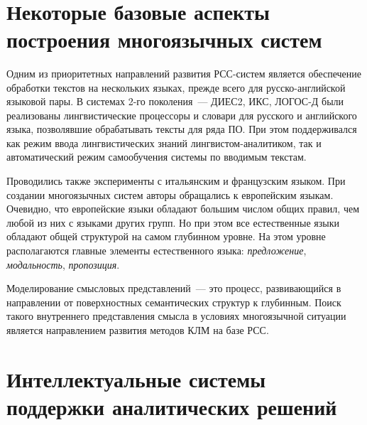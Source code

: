 \begin{multicols}{2}
\begin{figure*}[b] %
\vspace*{24pt}
\begin{center}
\mbox{%
\epsfxsize=156.873mm
}
\end{center}
\end{figure*}
     

\section{Некоторые базовые аспекты построения многоязычных 
систем}
     
     Одним из приоритетных направлений развития РСС-сис\-тем является 
обеспечение обработки текстов на нескольких языках, прежде всего для 
рус\-ско-анг\-лий\-ской языковой пары. В системах 2-го поколения~--- ДИЕС2, 
ИКС, ЛОГОС-Д были реализованы лингвистические процессоры и словари 
для русского и английского языка, позволявшие обрабатывать тексты для 
ряда ПО. При этом поддерживался как режим ввода 
лингвистических знаний линг\-вис\-том-ана\-ли\-ти\-ком, так и 
автоматический режим самообучения системы по вводимым \mbox{текстам}. 
{

}

Проводились также эксперименты с итальянским и французским языком. 
При создании многоязычных систем авторы обращались к европейским 
языкам. Очевидно, что европейские языки обладают большим числом общих 
правил, чем любой из них с языками других групп. Но при этом все 
естественные языки обладают общей структурой на самом глубинном 
уровне. На этом уровне располагаются главные элементы естественного 
языка: \textit{предложение}, \textit{модальность}, \textit{пропозиция}.
     
     Моделирование смысловых представлений~--- это процесс, 
развивающийся в направлении от поверхностных семантических структур к 
глубинным. Поиск такого внутреннего представления смысла в условиях 
многоязычной ситуации является на\-прав\-ле\-ни\-ем развития методов 
     КЛМ на базе  РСС. 
     
     
\section{Интеллектуальные системы поддержки аналитических 
решений}
     

\end{multicols}
